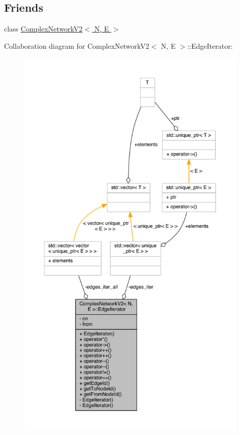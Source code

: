 \subsection*{Friends}
\begin{DoxyCompactItemize}
\item 
class \hyperlink{class_complex_network_v2_1_1_edge_iterator_adb5cc6ad363066c6e1f832e8cb0bf2b8}{Complex\+Network\+V2$<$ N, E $>$}
\end{DoxyCompactItemize}


Collaboration diagram for Complex\+Network\+V2$<$ N, E $>$\+:\+:Edge\+Iterator\+:\nopagebreak
\begin{figure}[H]
\begin{center}
\leavevmode
\includegraphics[height=550pt]{class_complex_network_v2_1_1_edge_iterator__coll__graph}
\end{center}
\end{figure}



